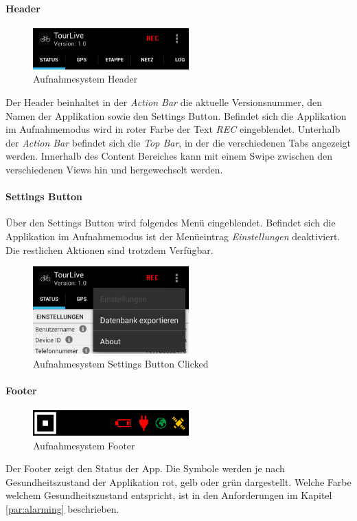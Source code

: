\paragraph{Header}
\begin{figure}[H]
	\centering
	\includegraphics[width=60mm]{images/android/header.png}
	\caption{Aufnahmesystem Header}
\end{figure}
Der Header beinhaltet in der \textit{Action Bar} die aktuelle Versionsnummer, den Namen der Applikation sowie den Settings Button. Befindet sich die Applikation im Aufnahmemodus wird in roter Farbe der Text \textit{REC} eingeblendet. Unterhalb der \textit{Action Bar} befindet sich die \textit{Top Bar}, in der die verschiedenen Tabs angezeigt werden. Innerhalb des Content Bereiches kann mit einem Swipe zwischen den verschiedenen Views  hin und hergewechselt werden.

\paragraph{Settings Button}
Über den Settings Button wird folgendes Menü eingeblendet. Befindet sich die Applikation im Aufnahmemodus ist der Menüeintrag \textit{Einstellungen} deaktiviert. Die restlichen Aktionen sind trotzdem Verfügbar.

\begin{figure}[H]
	\centering
	\includegraphics[width=60mm]{images/android/settingsclicked.png}
	\caption{Aufnahmesystem Settings Button Clicked}
\end{figure}



\paragraph{Footer}
\begin{figure}[H]
	\centering
	\includegraphics[width=60mm]{images/android/footer.png}
	\caption{Aufnahmesystem Footer}
\end{figure}
Der Footer zeigt den Status der App. Die Symbole werden je nach Gesundheitszustand der Applikation rot, gelb oder grün dargestellt. Welche Farbe welchem Gesundheitszustand entspricht, ist in den Anforderungen im Kapitel \ref{par:alarming} beschrieben.\\

